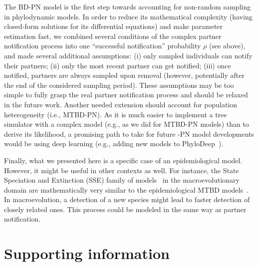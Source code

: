 \documentclass[10pt,letterpaper]{article}
\begin{document}
\bigskip 

The BD-PN model is the first step towards accounting for non-random sampling in phylodynamic models. In order to reduce its mathematical complexity (having closed-form solutions for its differential equations) and make parameter estimation fast, we combined several conditions of the complex partner notification process into one ``successful notification'' probability $\rho$ (see above), and made several additional assumptions: (i) only sampled individuals can notify their partners; (ii) only the most recent partner can get notified; (iii) once notified, partners are always sampled upon removal (however, potentially after the end of the considered sampling period). These assumptions may be too simple to fully grasp the real partner notification process and should be relaxed in the future work. Another needed extension should account for population heterogeneity (i.e., MTBD-PN). As it is much easier to implement a tree simulator with a complex model (e.g., as we did for MTBD-PN models) than to derive its likelihood, a promising path to take for future -PN model developments would be using deep learning (e.g., adding new models to PhyloDeep~\cite{Voznica2021}). 

Finally, what we presented here is a specific case of an epidemiological model. However, it might be useful in other contexts as well.
For instance, the State Speciation and Extinction (SSE) family of models~\cite{Maddison2007,fitzjohnEstimatingTraitDependentSpeciation2009,goldbergTempoModePlant2012} in the macroevolutionary domain are mathematically very similar to the epidemiological MTBD models~\cite{macphersonUnifyingPhylogeneticBirth2022}. In macroevolution, a detection of a new species might lead to faster detection of closely related ones. This process could be modeled in the same way as partner notification. 


\section*{Supporting information}
\end{document}
